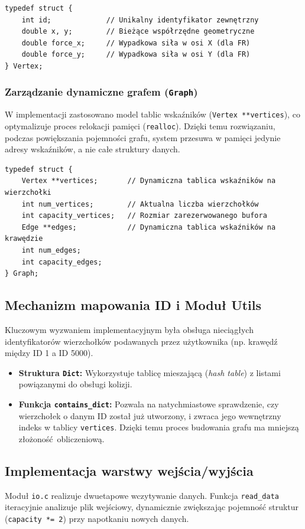 \documentclass[12pt,a4paper]{article}
\begin{document}
\begin{verbatim}
typedef struct {
    int id;             // Unikalny identyfikator zewnętrzny
    double x, y;        // Bieżące współrzędne geometryczne
    double force_x;     // Wypadkowa siła w osi X (dla FR)
    double force_y;     // Wypadkowa siła w osi Y (dla FR)
} Vertex;
\end{verbatim}

\subsubsection{Zarządzanie dynamiczne grafem (\texttt{Graph})}
W implementacji zastosowano model tablic wskaźników (\texttt{Vertex **vertices}), co optymalizuje proces relokacji pamięci (\texttt{realloc}). Dzięki temu rozwiązaniu, podczas powiększania pojemności grafu, system przesuwa w pamięci jedynie adresy wskaźników, a nie całe struktury danych.

\begin{verbatim}
typedef struct {
    Vertex **vertices;       // Dynamiczna tablica wskaźników na wierzchołki
    int num_vertices;        // Aktualna liczba wierzchołków
    int capacity_vertices;   // Rozmiar zarezerwowanego bufora
    Edge **edges;            // Dynamiczna tablica wskaźników na krawędzie
    int num_edges;
    int capacity_edges;
} Graph;
\end{verbatim}

\subsection{Mechanizm mapowania ID i Moduł Utils}
Kluczowym wyzwaniem implementacyjnym była obsługa nieciągłych identyfikatorów wierzchołków podawanych przez użytkownika (np. krawędź między ID 1 a ID 5000). 
\begin{itemize}
    \item \textbf{Struktura \texttt{Dict}:} Wykorzystuje tablicę mieszającą (\textit{hash table}) z listami powiązanymi do obsługi kolizji.
    \item \textbf{Funkcja \texttt{contains\_dict}:} Pozwala na natychmiastowe sprawdzenie, czy wierzchołek o danym ID został już utworzony, i zwraca jego wewnętrzny indeks w tablicy \texttt{vertices}. Dzięki temu proces budowania grafu ma mniejszą złożoność obliczeniową.
\end{itemize}

\subsection{Implementacja warstwy wejścia/wyjścia}
Moduł \texttt{io.c} realizuje dwuetapowe wczytywanie danych. Funkcja \texttt{read\_data} iteracyjnie analizuje plik wejściowy, dynamicznie zwiększając pojemność struktur (\texttt{capacity *= 2}) przy napotkaniu nowych danych.
\end{document}
